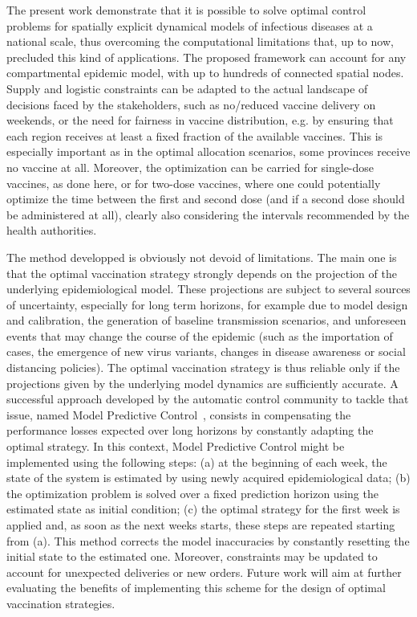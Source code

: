The present work demonstrate that it is possible to solve optimal control problems for spatially explicit dynamical models of infectious diseases at a national scale, thus overcoming the computational limitations that, up to now, precluded this kind of applications. The proposed framework can account for any compartmental epidemic model, with up to hundreds of connected spatial nodes. Supply and logistic constraints can be adapted to the actual landscape of decisions faced by the stakeholders, such as no/reduced vaccine delivery on weekends, or the need for fairness in vaccine distribution, e.g. by ensuring that each region receives at least a fixed fraction of the available vaccines. This is especially important as in the optimal allocation scenarios, some provinces receive no vaccine at all. Moreover, the optimization can be carried for single-dose vaccines, as done here, or for two-dose vaccines, where one could potentially optimize the time between the first and second dose (and if a second dose should be administered at all), clearly also considering the intervals recommended by the health authorities.

The method developped is obviously not devoid of limitations. The main one is that the optimal vaccination strategy strongly depends on the projection of the underlying epidemiological model. These projections are subject to several sources of uncertainty, especially for long term horizons, for example due to model design and calibration\cite{Cramer:EvaluationIndividualEnsemble:2021}, the generation of baseline transmission scenarios, and unforeseen events that may change the course of the epidemic (such as the importation of cases, the emergence of new virus variants, changes in disease awareness or social distancing policies). The optimal vaccination strategy is thus reliable only if the projections given by the underlying model dynamics are sufficiently accurate. A successful approach developed by the automatic control community to tackle that issue, named Model Predictive Control~\cite{Rawlings:ModelPredictiveControl:2017}, consists in compensating the performance losses expected over long horizons by constantly adapting the optimal strategy. In this context, Model Predictive Control might be implemented using the following steps: (a) at the beginning of each week, the state of the system is estimated by using newly acquired epidemiological data; (b) the optimization problem is solved over a fixed prediction horizon using the estimated state as initial condition; (c) the optimal strategy for the first week is applied and, as soon as the next weeks starts, these steps are repeated starting from (a). This method corrects the model inaccuracies by constantly resetting the initial state to the estimated one. Moreover, constraints may be updated to account for unexpected deliveries or new orders. Future work will aim at further evaluating the benefits of implementing this scheme for the design of optimal vaccination strategies.

